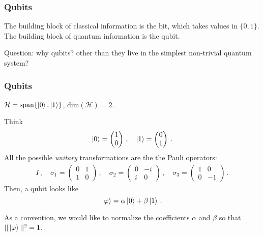 \documentclass[12pt]{beamer}
\begin{document}
\begin{frame}
    \frametitle{Qubits}
    The building block of classical information is the bit, which takes values in 
    $\{0,1\}$.
    The building block of quantum information is the qubit.

    \pause

    Question: why qubits? other than they live in the simplest non-trivial quantum system?

\end{frame}

\begin{frame}
    \frametitle{Qubits}
    $\mathcal{H} = \mathrm{span}\{\ket{0}, \ket{1}\}$,
    $\mathrm{dim}(\mathcal{H}) = 2$.

    Think 
    \begin{equation*}
        \ket{0} = \begin{pmatrix}
            1 \\ 0
        \end{pmatrix} \,, \quad 
            \ket{1} =
        \begin{pmatrix}
            0 \\1 
        \end{pmatrix}\,.
    \end{equation*}
    All the possible \emph{unitary} transformations are the the Pauli operators:
    \begin{gather*}
        I \,, \quad \sigma_1 = \begin{pmatrix}
            0 & 1 \\ 1 & 0
        \end{pmatrix} \,,
        \quad \sigma_2 = \begin{pmatrix}
            0 & -i \\ i & 0
        \end{pmatrix} \,,
        \quad \sigma_3 = \begin{pmatrix}
            1 & 0 \\ 0 &-1 
        \end{pmatrix} \,.
    \end{gather*}
    Then, a qubit looks like
    \begin{equation*}
        \ket{\varphi} = \alpha \ket{0} + \beta \ket{1} \,.
    \end{equation*}

    As a convention, we would like to normalize the coefficients $\alpha$ and $\beta$
    so that $|| \ket{\varphi} ||^2 = 1$.
     
\end{frame}
\end{document}

